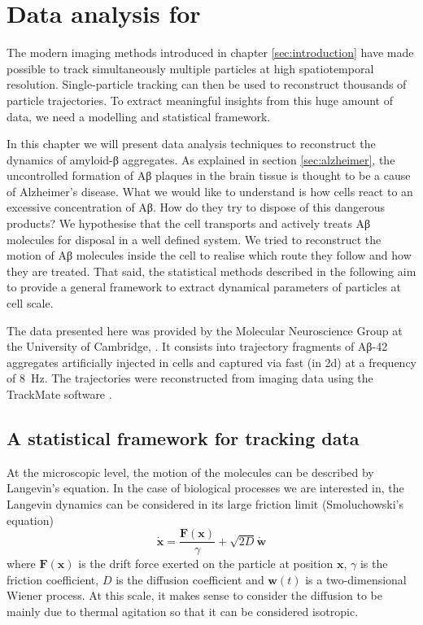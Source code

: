 
\chapter{Data analysis for }\label{sec:data_analysis}


The modern imaging methods introduced in chapter \ref{sec:introduction} have made possible to track simultaneously multiple particles at high spatiotemporal resolution. Single-particle tracking can then be used to reconstruct thousands of particle trajectories. To extract meaningful insights from this huge amount of data, we need a modelling and statistical framework.

In this chapter we will present data analysis techniques to reconstruct the dynamics of amyloid-β aggregates. As explained in section \ref{sec:alzheimer}, the uncontrolled formation of Aβ plaques in the brain tissue is thought to be a cause of Alzheimer's disease. What we would like to understand is how cells react to an excessive concentration of Aβ. How do they try to dispose of this dangerous products? We hypothesise that the cell transports and actively treats Aβ molecules for disposal in a well defined system. We tried to reconstruct the motion of Aβ molecules inside the cell to realise which route they follow and how they are treated. That said, the statistical methods described in the following aim to provide a general framework to extract dynamical parameters of particles at cell scale.

The data presented here was provided by the Molecular Neuroscience Group at the University of Cambridge, . It consists into trajectory fragments of Aβ-42 aggregates artificially injected in  cells and captured via fast  (in 2d) at a frequency of \SI{8}{\hertz}. The trajectories were reconstructed from imaging data using the TrackMate software .

\section{A statistical framework for tracking data}

At the microscopic level, the motion of the molecules can be described by Langevin's equation. In the case of biological processes we are interested in, the Langevin dynamics can be considered in its large friction limit (Smoluchowski's equation) 
\begin{equation} \label{eq:smoluchowski}
 \dot{\bm{x}} = \frac{\bm{F}(\bm{x})}{\gamma} + \sqrt{2D} \dot{\bm{w}}
\end{equation}
where $\bm{F}(\bm{x})$ is the drift force exerted on the particle at position $\bm{x}$, $\gamma$ is the friction coefficient, $D$ is the diffusion coefficient and $\bm{w}(t)$ is a two-dimensional Wiener process. At this scale, it makes sense to consider the diffusion to be mainly due to thermal agitation so that it can be considered isotropic.

